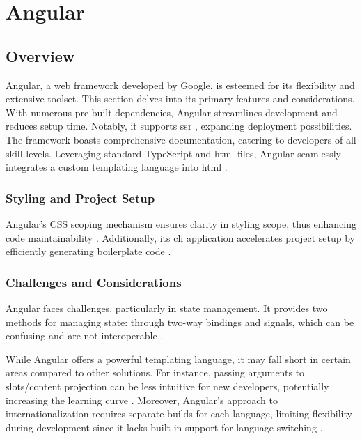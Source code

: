 \section{Angular}
\label{sec:angular}

\subsection{Overview}
\label{subsec:angular:overview}

Angular, a web framework developed by Google, is esteemed for its flexibility and extensive toolset. This section delves into its primary features and considerations. With numerous pre-built dependencies, Angular streamlines development and reduces setup time. Notably, it supports \acrfull{ssr} \cite{angulardev:ssr}, expanding deployment possibilities. The framework boasts comprehensive documentation, catering to developers of all skill levels. Leveraging standard TypeScript and \acrshort{html} files, Angular seamlessly integrates a custom templating language into \acrshort{html} \cite{angulardev:template_syntax}.

\subsubsection{Styling and Project Setup}

Angular's CSS scoping mechanism ensures clarity in styling scope, thus enhancing code maintainability \cite{angulardev:styling_components}. Additionally, its \acrshort{cli} application accelerates project setup by efficiently generating boilerplate code \cite{angulardev:cli}.

\subsubsection{Challenges and Considerations}
\label{subsec:angular:challenges}

Angular faces challenges, particularly in state management. It provides two methods for managing state: through two-way bindings and signals, which can be confusing and are not interoperable \cite{angulardev:managing_dynamic_data, angulardev:signals}.

While Angular offers a powerful templating language, it may fall short in certain areas compared to other solutions. For instance, passing arguments to slots/content projection can be less intuitive for new developers, potentially increasing the learning curve \cite{angulardev:ng_container}. Moreover, Angular's approach to internationalization requires separate builds for each language, limiting flexibility during development since it lacks built-in support for language switching \cite{angulardev:i18n}.

